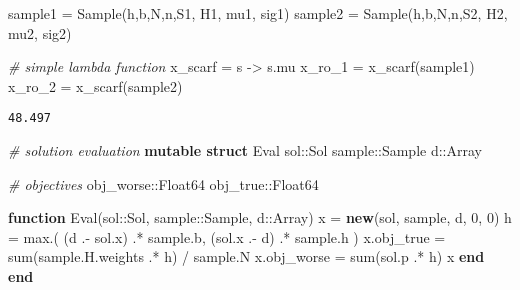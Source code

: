 \documentclass[
  10pt,
  a4paper,
,tablecaptionabove
]{scrartcl}
\newenvironment{Shaded}{}{}
\newcommand{\CommentTok}[1]{\textcolor[rgb]{0.38,0.63,0.69}{\textit{#1}}}
\newcommand{\DataTypeTok}[1]{\textcolor[rgb]{0.56,0.13,0.00}{#1}}
\newcommand{\FloatTok}[1]{\textcolor[rgb]{0.25,0.63,0.44}{#1}}
\newcommand{\KeywordTok}[1]{\textcolor[rgb]{0.00,0.44,0.13}{\textbf{#1}}}
\newcommand{\NormalTok}[1]{#1}
\newcommand{\OperatorTok}[1]{\textcolor[rgb]{0.40,0.40,0.40}{#1}}
\begin{document}
\begin{Shaded}
\begin{Highlighting}[]
\NormalTok{sample1 }\OperatorTok{=}\NormalTok{ Sample(h}\OperatorTok{,}\NormalTok{b}\OperatorTok{,}\NormalTok{N}\OperatorTok{,}\NormalTok{n}\OperatorTok{,}\NormalTok{S1}\OperatorTok{,}\NormalTok{ H1}\OperatorTok{,}\NormalTok{ mu1}\OperatorTok{,}\NormalTok{ sig1)}
\NormalTok{sample2 }\OperatorTok{=}\NormalTok{ Sample(h}\OperatorTok{,}\NormalTok{b}\OperatorTok{,}\NormalTok{N}\OperatorTok{,}\NormalTok{n}\OperatorTok{,}\NormalTok{S2}\OperatorTok{,}\NormalTok{ H2}\OperatorTok{,}\NormalTok{ mu2}\OperatorTok{,}\NormalTok{ sig2)}

\CommentTok{\# simple lambda function}
\NormalTok{x\_scarf }\OperatorTok{=}\NormalTok{ s }\OperatorTok{{-}\textgreater{}}\NormalTok{ s.mu}
\NormalTok{x\_ro\_1 }\OperatorTok{=}\NormalTok{ x\_scarf(sample1)}
\NormalTok{x\_ro\_2 }\OperatorTok{=}\NormalTok{ x\_scarf(sample2)}
\end{Highlighting}
\end{Shaded}

\begin{verbatim}
48.497
\end{verbatim}

\begin{Shaded}
\begin{Highlighting}[]
\CommentTok{\# solution evaluation}
\KeywordTok{mutable struct}\NormalTok{ Eval}
\NormalTok{    sol}\OperatorTok{::}\NormalTok{Sol}
\NormalTok{    sample}\OperatorTok{::}\NormalTok{Sample}
\NormalTok{    d}\OperatorTok{::}\DataTypeTok{Array}
    
    \CommentTok{\# objectives}
\NormalTok{    obj\_worse}\OperatorTok{::}\DataTypeTok{Float64}
\NormalTok{    obj\_true}\OperatorTok{::}\DataTypeTok{Float64}
    
    \KeywordTok{function}\NormalTok{ Eval(sol}\OperatorTok{::}\NormalTok{Sol}\OperatorTok{,}\NormalTok{ sample}\OperatorTok{::}\NormalTok{Sample}\OperatorTok{,}\NormalTok{ d}\OperatorTok{::}\DataTypeTok{Array}\NormalTok{)}
\NormalTok{        x }\OperatorTok{=} \KeywordTok{new}\NormalTok{(sol}\OperatorTok{,}\NormalTok{ sample}\OperatorTok{,}\NormalTok{ d}\OperatorTok{,} \FloatTok{0}\OperatorTok{,} \FloatTok{0}\NormalTok{)}
\NormalTok{        h }\OperatorTok{=}\NormalTok{ max.(}
\NormalTok{            (d .}\OperatorTok{{-}}\NormalTok{ sol.x) }\OperatorTok{.*}\NormalTok{ sample.b}\OperatorTok{,} 
\NormalTok{            (sol.x .}\OperatorTok{{-}}\NormalTok{ d) }\OperatorTok{.*}\NormalTok{ sample.h}
\NormalTok{        )}
\NormalTok{        x.obj\_true }\OperatorTok{=}\NormalTok{ sum(sample.H.weights }\OperatorTok{.*}\NormalTok{ h) }\OperatorTok{/}\NormalTok{ sample.N}
\NormalTok{        x.obj\_worse }\OperatorTok{=}\NormalTok{ sum(sol.p }\OperatorTok{.*}\NormalTok{ h)}
\NormalTok{        x}
    \KeywordTok{end}
\KeywordTok{end}
\end{Highlighting}
\end{Shaded}
\end{document}
